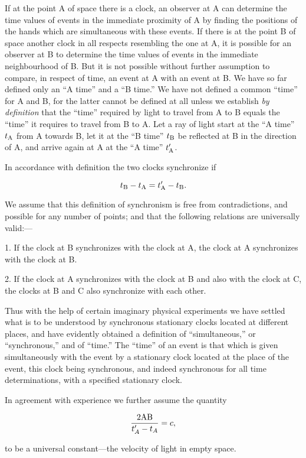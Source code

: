 \documentclass{article}
\begin{document}
If at the point A of space there is a clock, an observer at A can
determine the time values of events in the immediate proximity of A by
finding the positions of the hands which are simultaneous with these
events.  If there is at the point B of space another clock in all
respects resembling the one at A, it is possible for an observer at B
to determine the time values of events in the immediate neighbourhood
of B\@.  But it is not possible without further assumption to compare, in
respect of time, an event at A with an event at B\@.  We have so far
defined only an ``A time'' and a ``B time.'' We have not defined a
common ``time'' for A and B, for the latter cannot be defined at all
unless we establish {\em by definition} that the ``time'' required by
light to travel from A to B equals the ``time'' it requires to travel
from B to A\@.  Let a ray of light start at the ``A time'' $t_{\rm A}$
from A towards B, let it at the ``B time'' $t_{\rm B}$ be reflected at
B in the direction of A, and arrive again at A at the ``A time''
$t'_{\rm A}$.

In accordance with definition the two clocks synchronize 
if 

\[
t_{\rm B}-t_{\rm A}=t'_{\rm A}-t_{\rm B}.
\]

We assume that this definition of synchronism is free from
contradictions, and possible for any number of points; and that the
following relations are universally valid:---

1.  If the clock at B synchronizes with the clock at A, the clock at A
synchronizes with the clock at B.

2.  If the clock at A synchronizes with the clock at B and also with
the clock at C, the clocks at B and C also synchronize with each
other.

Thus with the help of certain imaginary physical experiments we have
settled what is to be understood by synchronous stationary clocks
located at different places, and have evidently obtained a definition
of ``simultaneous,'' or ``synchronous,'' and of ``time.'' The ``time'' of an
event is that which is given simultaneously with the event by a
stationary clock located at the place of the event, this clock being
synchronous, and indeed synchronous for all time determinations, with
a specified stationary clock.

In agreement with experience we further assume the quantity 

\[
\frac{2{\rm AB}}{t'_A-t_A}=c,
\]

\noindent
to be a universal constant---the velocity of light in empty space. 
\end{document}

